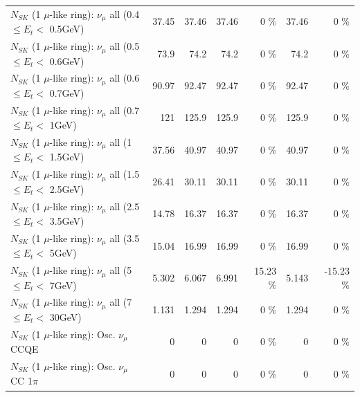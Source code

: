 \begin{table}
\begin{tabular}{| l | r | r | r  r | r  r |}
       $N_{SK}$ (1 $\mu$-like ring): $\nu_{\mu}$ all (0.4 $\leq E_{t} <$ 0.5GeV) &           37.45 &           37.46 &           37.46 &        0 \%  &           37.46 &        0 \%  \\ 
       $N_{SK}$ (1 $\mu$-like ring): $\nu_{\mu}$ all (0.5 $\leq E_{t} <$ 0.6GeV) &            73.9 &            74.2 &            74.2 &        0 \%  &            74.2 &        0 \%  \\ 
       $N_{SK}$ (1 $\mu$-like ring): $\nu_{\mu}$ all (0.6 $\leq E_{t} <$ 0.7GeV) &           90.97 &           92.47 &           92.47 &        0 \%  &           92.47 &        0 \%  \\ 
         $N_{SK}$ (1 $\mu$-like ring): $\nu_{\mu}$ all (0.7 $\leq E_{t} <$ 1GeV) &             121 &           125.9 &           125.9 &        0 \%  &           125.9 &        0 \%  \\ 
         $N_{SK}$ (1 $\mu$-like ring): $\nu_{\mu}$ all (1 $\leq E_{t} <$ 1.5GeV) &           37.56 &           40.97 &           40.97 &        0 \%  &           40.97 &        0 \%  \\ 
       $N_{SK}$ (1 $\mu$-like ring): $\nu_{\mu}$ all (1.5 $\leq E_{t} <$ 2.5GeV) &           26.41 &           30.11 &           30.11 &        0 \%  &           30.11 &        0 \%  \\ 
       $N_{SK}$ (1 $\mu$-like ring): $\nu_{\mu}$ all (2.5 $\leq E_{t} <$ 3.5GeV) &           14.78 &           16.37 &           16.37 &        0 \%  &           16.37 &        0 \%  \\ 
         $N_{SK}$ (1 $\mu$-like ring): $\nu_{\mu}$ all (3.5 $\leq E_{t} <$ 5GeV) &           15.04 &           16.99 &           16.99 &        0 \%  &           16.99 &        0 \%  \\ 
           $N_{SK}$ (1 $\mu$-like ring): $\nu_{\mu}$ all (5 $\leq E_{t} <$ 7GeV) &           5.302 &           6.067 &           6.991 &    15.23 \%  &           5.143 &   -15.23 \%  \\ 
          $N_{SK}$ (1 $\mu$-like ring): $\nu_{\mu}$ all (7 $\leq E_{t} <$ 30GeV) &           1.131 &           1.294 &           1.294 &        0 \%  &           1.294 &        0 \%  \\ 
\hline
\hline
                               $N_{SK}$ (1 $\mu$-like ring): Osc. $\nu_\mu$ CCQE &               0 &               0 &               0 &        0 \%  &               0 &        0 \%  \\ 
                          $N_{SK}$ (1 $\mu$-like ring): Osc. $\nu_\mu$ CC 1$\pi$ &               0 &               0 &               0 &        0 \%  &               0 &        0 \%  \\ 

\end{tabular}
\end{table}
